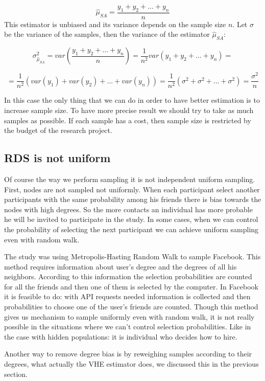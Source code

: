 \documentclass[12pt]{report}
\begin{document}
$$ \widehat{\mu}_{SA} = \frac{y_1 + y_2 + ... + y_n}{n}$$
This estimator is unbiased and its variance depends on the sample size $n$. Let $\sigma$ be the variance of the samples, then the variance of the estimator $ \widehat{\mu}_{SA}$:

$$ \sigma^2_{\hat{\mu}_{SA}} = var\left( \frac{y_1 + y_2 + ... + y_n}{n}\right)=\frac{1}{n^2} var(y_1 + y_2 + ... + y_n) =$$

$$= \frac{1}{n^2} \left(var(y_1) + var(y_2) + ... + var(y_n)\right)=\frac{1}{n^2} \left(\sigma^2 + \sigma^2 + ... + \sigma^2\right) = \frac{\sigma^2}{n}$$

In this case the only thing that we can do in order to have better estimation is to increase sample size. To have more precise result we should try to take as much samples as possible. If each sample has a cost, then sample size is restricted by the budget of the research project. 


\subsection{RDS is not uniform}


Of course the way we perform sampling it is not independent uniform sampling. 
First, nodes are not sampled not uniformly. When each participant select another  participants with the same probability among his friends there is bias towards the nodes with high degrees. So the more contacts an individual has more probable he will be invited to participate in the study. In some cases, when we can control the probability of selecting the next participant we can achieve uniform sampling even with random walk.

The study \cite{gjoka2009walk} was using Metropolis-Hasting Random Walk to sample Facebook. This method requires information about user's degree and the degrees of all his neighbors. According to this information the selection probabilities are counted for all the friends and then one of them is selected by the computer.
In Facebook it is feasible to do: with API requests needed information is collected and then probabilities to choose one of the user's friends are counted. Though this method gives us mechanism to sample uniformly even with random walk, it is not really possible in the situations where we can't control selection probabilities. Like in the case with hidden populations: it is individual who decides how to hire. 

Another way to remove degree bias is by reweighing samples according to their degrees, what actually the VHE estimator does, we discussed this in the previous section. 
\end{document}
